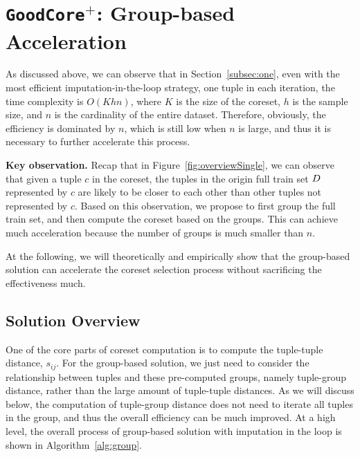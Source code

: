 

\section{\texttt{GoodCore}$^+$: Group-based Acceleration}
\label{sec:group}

As discussed above, we can observe that in Section~\ref{subsec:one}, even with the most efficient imputation-in-the-loop  strategy, \ie  one tuple in  each iteration, the time complexity is  $O(Khn)$, where $K$ is the size of the coreset, $h$ is the sample size,  and $n$ is the cardinality of the entire dataset. Therefore, obviously, the efficiency is dominated by $n$, which is still low when $n$ is large, and thus it  is necessary to further accelerate this process.

\noindent \textbf{Key observation.}   Recap that in Figure~\ref{fig:overviewSingle}, we can observe that  given a tuple $c$ in the coreset, the tuples in the origin full train set $D$ represented by $c$ are likely to be  closer to each other than other tuples not represented by $c$.
Based on this observation, we propose to first group the full train set, and then compute the coreset based on the groups. This can achieve much acceleration because the number of groups is much smaller than $n$. 

At the following, we will theoretically and empirically show that the group-based solution can accelerate the coreset selection process without sacrificing the effectiveness much.


\subsection{Solution Overview}


One of the core parts of coreset computation is to compute the tuple-tuple distance, \ie $s_{ij}$. For the group-based solution, we just need to consider the relationship between tuples and these pre-computed groups, namely tuple-group distance, rather than the large amount of tuple-tuple distances. As we will discuss below, the computation of tuple-group distance does not need to iterate all tuples in the group, and thus  the overall efficiency can be much improved. 
%
At a high level, the overall process of group-based \ours solution with imputation in the loop is shown in Algorithm~\ref{alg:group}.%


